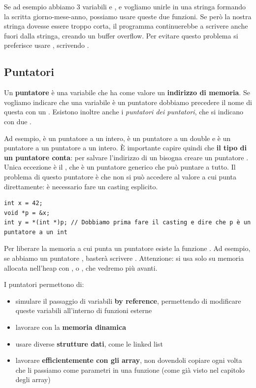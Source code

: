 \documentclass[11pt, a4paper, titlepage, oneside]{scrbook}
\begin{document}
Se ad esempio abbiamo 3 variabili  e , e vogliamo unirle in una stringa formando la scritta giorno-mese-anno, possiamo usare queste due funzioni. Se però la nostra stringa dovesse essere troppo corta, il programma continuerebbe a scrivere anche fuori dalla stringa, creando un buffer overflow. Per evitare questo problema si preferisce usare , scrivendo .

\subsection{Puntatori}

\begin{Definizione}[Puntatore]
\label{def-puntatore}
Un \textbf{puntatore} è una variabile che ha come valore un \textbf{indirizzo di memoria}. Se vogliamo indicare che una variabile è un puntatore dobbiamo precedere il nome di questa con un \codeb{*}. Esistono inoltre anche i \textit{puntatori dei puntatori}, che si indicano con due \code{*}. 
\end{Definizione}

Ad esempio,  è un puntatore a un intero,  è un puntatore a un double e  è un puntatore a un puntatore a un intero. È importante capire quindi che \textbf{il tipo di un puntatore conta}: per salvare l'indirizzo di un  bisogna creare un puntatore . Unica eccezione è il , che è un puntatore generico che può puntare a tutto. Il problema di questo puntatore è che non si può accedere al valore a cui punta direttamente: è necessario fare un casting esplicito.
\begin{lstlisting}[style=C]
int x = 42;
void *p = &x;
int y = *(int *)p; // Dobbiamo prima fare il casting e dire che p è un puntatore a un int
\end{lstlisting}

Per liberare la memoria a cui punta un puntatore esiste la funzione . Ad esempio, se abbiamo un puntatore , basterà scrivere . Attenzione:  si usa solo su memoria allocata nell'heap con ,  o , che vedremo più avanti.

I puntatori permettono di:
\begin{itemize}
    \item simulare il passaggio di variabili \textbf{by reference}, permettendo di modificare queste variabili all'interno di funzioni esterne
    \item lavorare con la \textbf{memoria dinamica}
    \item usare diverse \textbf{strutture dati}, come le linked list
    \item lavorare \textbf{efficientemente con gli array}, non dovendoli copiare ogni volta che li passiamo come parametri in una funzione (come già visto nel capitolo degli array)
\end{itemize}
\end{document}
